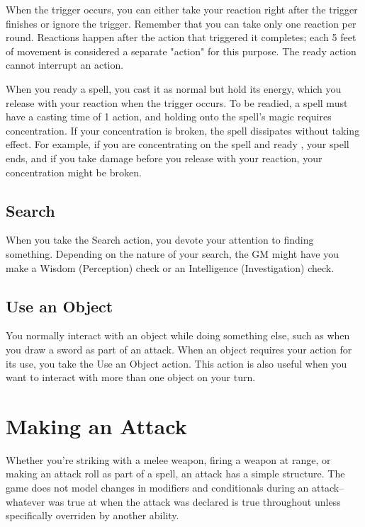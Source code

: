 When the trigger occurs, you can either take your reaction right after the trigger finishes or ignore the trigger. Remember that you can take only one reaction per round. Reactions happen after the action that triggered it completes; each 5 feet of movement is considered a separate "action" for this purpose. The ready action cannot interrupt an action.

When you ready a spell, you cast it as normal but hold its energy, which you release with your reaction when the trigger occurs. To be readied, a spell must have a casting time of 1 action, and holding onto the spell's magic requires concentration. If your concentration is broken, the spell dissipates without taking effect. For example, if you are concentrating on the  spell and ready , your  spell ends, and if you take damage before you release  with your reaction, your concentration might be broken.

\subsection{Search}

When you take the Search action, you devote your attention to finding something. Depending on the nature of your search, the GM might have you make a Wisdom (Perception) check or an Intelligence (Investigation) check.

\subsection{Use an Object}

You normally interact with an object while doing something else, such as when you draw a sword as part of an attack. When an object requires your action for its use, you take the Use an Object action. This action is also useful when you want to interact with more than one object on your turn.

\section{Making an Attack}

Whether you're striking with a melee weapon, firing a weapon at range, or making an attack roll as part of a spell, an attack has a simple structure. The game does not model changes in modifiers and conditionals during an attack--whatever was true at when the attack was declared is true throughout unless specifically overriden by another ability.

